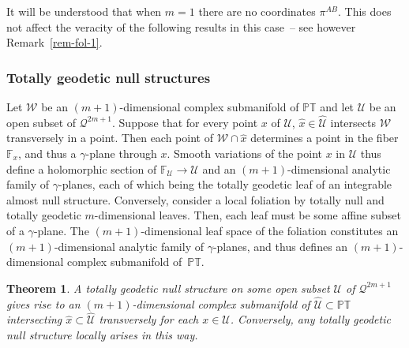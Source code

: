 \documentclass[10pt,a4paper]{amsart}
\numberwithin{equation}{section}
\newtheorem{Theorem}{Theorem}[section]
\newcommand{\mc} [1]{\mathcal{#1}}
\newcommand{\PT} {\mathbb{PT}}
\newcommand{\F} {\mathbb{F}}
\begin{document}
\begin{Remark}It will be understood that when $m=1$ there are no coordinates $\pi^{AB}$. This does not af\/fect the veracity of the following results in this case~-- see however Remark~\ref{rem-fol-1}.
\end{Remark}

\subsubsection{Totally geodetic null structures}
Let $\mc{W}$ be an $(m+1)$-dimensional complex submanifold of $\PT$ and let $\mc{U}$ be an open subset of $\mc{Q}^{2m+1}$. Suppose that for every point $x$ of $\mc{U}$, $\hat{x} \in \widehat{\mc{U}}$ intersects $\mc{W}$ transversely in a point. Then each point of $\mc{W} \cap \hat{x}$ determines a point in the f\/iber $\F_x$, and thus a $\gamma$-plane through $x$. Smooth variations of the point $x$ in $\mc{U}$ thus def\/ine a holomorphic section of $\F_\mc{U} \rightarrow \mc{U}$ and an $(m+1)$-dimensional analytic family of $\gamma$-planes, each of which being the totally geodetic leaf of an integrable almost null structure. Conversely, consider a local foliation by totally null and totally geodetic $m$-dimensional leaves. Then, each leaf must be some af\/f\/ine subset of a $\gamma$-plane. The $(m+1)$-dimensional leaf space of the foliation constitutes an $(m+1)$-dimensional analytic family of $\gamma$-planes, and thus def\/ines an $(m+1)$-dimensional complex submanifold of~$\PT$.


\begin{Theorem}\label{thm-odd-Kerr-theorem-I}
A totally geodetic null structure on some open subset $\mc{U}$ of $\mc{Q}^{2m+1}$ gives rise to an $(m+1)$-dimensional complex submanifold of $\widehat{\mc{U}} \subset \PT$ intersecting $\hat{x} \subset \widehat{\mc{U}}$ transversely for each $x \in \mc{U}$. Conversely, any totally geodetic null structure locally arises in this way.
\end{Theorem}
\end{document}
